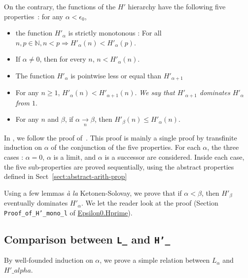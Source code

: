 


On the contrary, the functions of the $H'$ hierarchy have the following five properties~\cite{KS81}: for any $\alpha < \epsilon_0$,
\begin{itemize}
\item the function $H'_\alpha$ is strictly monotonous :
      For all $n,p \in\mathbb{N}, n < p \Rightarrow H'_\alpha(n)< H'_\alpha(p)$.
\item If $\alpha \not= 0$, then for every $n$, $n<H'_\alpha(n)$.
\item The function $H'_\alpha$ is pointwise less or equal than $H'_{\alpha+1}$

\item For any $n\geq 1$, $H'_\alpha(n)<H'_{\alpha+1}(n)$.
\emph{We say that $H'_{\alpha+1}$ dominates $H'_\alpha$ from $1$}.
\item For any $n$ and $\beta$, if $\alpha \xrightarrow[n]{} \beta$, then
$H'_\beta(n)\leq H'_\alpha(n)$.
\end{itemize}





In \coq{}, we follow the  proof of~\cite{KS81}. This proof is mainly a single  proof by transfinite induction on $\alpha$ of the conjunction of the five properties.
For each $\alpha$, the three cases : $\alpha=0$, $\alpha$ is a limit, and 
$\alpha$ is a successor are considered. Inside each case, the five sub-properties are proved sequentially, using the abstract properties defined in Sect~\vref{sect:abstract-arith-prop}




Using a few lemmas \emph{à la} Ketonen-Solovay, we prove that
if $\alpha<\beta$, then $H'_\beta$ eventually dominates
$H'_\alpha$.
We let the reader look at the proof (Section \texttt{Proof\_of\_H'\_mono\_l} of \href{../theories/html/hydras.Epsilon0.Hprime.html\#H_}{Epsilon0.Hprime}).

\noindent


\subsection{Comparison between \texttt{L\_} and \texttt{H'\_} }

By well-founded induction on $\alpha$, we prove a simple relation between $L_\alpha$ and $H'\_alpha$.

